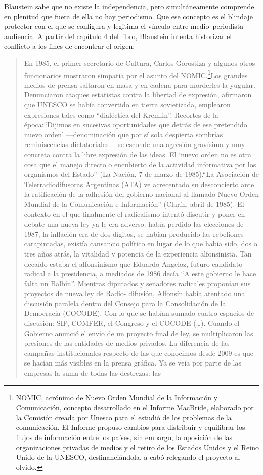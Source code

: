 Blaustein sabe que no existe la independencia, pero simultáneamente comprende en plenitud que fuera de ella no hay periodismo. Que ese concepto es el blindaje protector con el que se configura y legitima el vínculo entre medio--periodista--audiencia. A partir del capítulo 4 del libro, Blaustein intenta historizar el conflicto a los fines de encontrar el origen:

\begin{quote}
En 1985, el primer secretario de Cultura, Carlos Gorostiza y algunos otros funcionarios mostraron simpatía por el asunto del NOMIC.\footnote{NOMIC, acrónimo de Nuevo Orden Mundial de la Información y Comunicación, concepto desarrollado en el Informe MacBride, elaborado por la Comisión creada por Unesco para el estudió de los problemas de la comunicación. El Informe propuso cambios para distribuir y equilibrar los flujos de información entre los países, sin embargo, la oposición de las organizaciones privadas de medios y el retiro de los Estados Unidos y el Reino Unido de la UNESCO, desfinanciándola, a cabó relegando el proyecto al olvido.}Los grandes medios de prensa saltaron en masa y en cadena para morderles la yugular. Denunciaron ataques estatistas contra la libertad de expresión, afirmaron que UNESCO se había convertido en tierra sovietizada, emplearon expresiones tales como ``dialéctica del Kremlin''. Recortes de la época:``Dijimos en sucesivas oportunidades que detrás de ese pretendido \textquotesingle nuevo orden' ---denominación que por sí sola despierta sombrías reminiscencias dictatoriales--- se esconde una agresión gravísima y muy concreta contra la libre expresión de las ideas. El `nuevo orden\textquotesingle{} no es otra cosa que el manejo directo o encubierto de la actividad informativa por los organismos del Estado'' (La Nación, 7 de marzo de 1985).``La Asociación de Telerradiodifusoras Argentinas (ATA) ve acrecentado su desconcierto ante la ratificación de la adhesión del gobierno nacional al llamado Nuevo Orden Mundial de la Comunicación e Información'' (Clarín, abril de 1985). El contexto en el que finalmente el radicalismo intentó discutir y poner en debate una nueva ley ya le era adverso: había perdido las elecciones de 1987, la inflación era de dos dígitos, se habían producido las rebeliones carapintadas, existía cansancio político en lugar de lo que había sido, dos o tres años atrás, la vitalidad y potencia de la experiencia alfonsinista. Tan decaído estaba el alfonsinismo que Eduardo Angeloz, futuro candidato radical a la presidencia, a mediados de 1986 decía ``A este gobierno le hace falta un Balbín''. Mientras diputados y senadores radicales proponían sus proyectos de nueva ley de Radio- difusión, Alfonsín había atentado una discusión paralela dentro del Consejo para la Consolidación de la Democracia (COCODE). Con lo que se habían sumado cuatro espacios de discusión: SIP, COMFER, el Congreso y el COCODE (\ldots). Cuando el Gobierno anunció el envío de un proyecto final de ley, se multiplicaron las presiones de las entidades de medios privados. La diferencia de las campañas institucionales respecto de las que conocimos desde 2009 es que se hacían más visibles en la prensa gráfica. Ya se veía por parte de las empresas la suma de todas las destrezas: las 
\end{quote}
